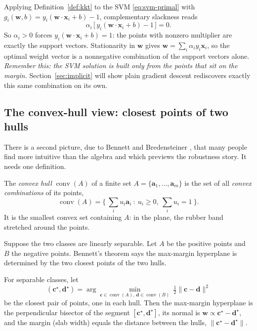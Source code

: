 Applying Definition~\ref{def:kkt} to the SVM \eqref{eq:svm-primal} with
$g_i(\mathbf{w},b) = y_i(\mathbf{w}\cdot\mathbf{x}_i+b)-1$, complementary
slackness reads
\[
  \alpha_i\,\big[\,y_i(\mathbf{w}\cdot\mathbf{x}_i+b)-1\,\big] = 0.
\]
So $\alpha_i>0$ forces $y_i(\mathbf{w}\cdot\mathbf{x}_i+b)=1$: the points
with nonzero multiplier are exactly the support vectors. Stationarity in
$\mathbf{w}$ gives $\mathbf{w} = \sum_i \alpha_i y_i \mathbf{x}_i$, so the
optimal weight vector is a nonnegative combination of the support vectors
alone. \emph{Remember this: the SVM solution is built only from the points
that sit on the margin.} Section~\ref{sec:implicit} will show plain
gradient descent rediscovers exactly this same combination on its own.

\subsection{The convex-hull view: closest points of two hulls}

There is a second picture, due to Bennett and Bredensteiner
\citep{bennett2000}, that many people find more intuitive than the
algebra and which previews the robustness story. It needs one definition.

\begin{definition}
The \emph{convex hull} $\operatorname{conv}(A)$ of a finite set
$A = \{\mathbf{a}_1, \dots, \mathbf{a}_m\}$ is the set of all
\emph{convex combinations} of its points,
\[
  \operatorname{conv}(A) = \Big\{\ \textstyle\sum_{i} u_i \mathbf{a}_i \ :\
  u_i \ge 0,\ \sum_i u_i = 1 \ \Big\}.
\]
It is the smallest convex set containing $A$: in the plane, the rubber
band stretched around the points.
\end{definition}

Suppose the two classes are linearly separable. Let $A$ be the positive
points and $B$ the negative points. Bennett's theorem says the max-margin
hyperplane is determined by the two closest points of the two hulls.

\begin{theorem}
\label{thm:hulls}
For separable classes, let
\[
  (\mathbf{c}^\star, \mathbf{d}^\star) = \arg\min_{\mathbf{c}\in\operatorname{conv}(A),\,
    \mathbf{d}\in\operatorname{conv}(B)} \ \tfrac{1}{2}\|\mathbf{c}-\mathbf{d}\|^2
\]
be the closest pair of points, one in each hull. Then the max-margin
hyperplane is the perpendicular bisector of the segment
$[\mathbf{c}^\star, \mathbf{d}^\star]$, its normal is
$\mathbf{w}\propto \mathbf{c}^\star - \mathbf{d}^\star$, and the margin
(slab width) equals the distance between the hulls,
$\|\mathbf{c}^\star - \mathbf{d}^\star\|$.
\end{theorem}

